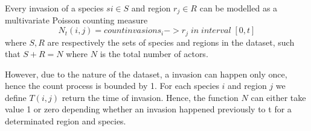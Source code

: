 \documentclass[mscthesis]{usiinfthesis}
\begin{document}
%
%
%


 Every invasion of a species $si \in S$ and region $r_j \in R$ can be modelled as a multivariate Poisson counting measure $$N_t(i, j) = count{invasion s_i -> r_j \; in \; interval \; [0, t]}$$ where $S, R$ are respectively the sets of species and regions in the dataset, such that $S+R = N$ where $N$ is the total number of actors. 

However, due to the nature of the dataset, a invasion can happen only once, hence the count process is bounded by 1. For each species $i$ and region $j$ we define $T(i, j)$ return the time of invasion. Hence, the function $N$ can either take value 1 or zero depending whether an invasion happened previously to t for a determinated region and species.
\end{document}

